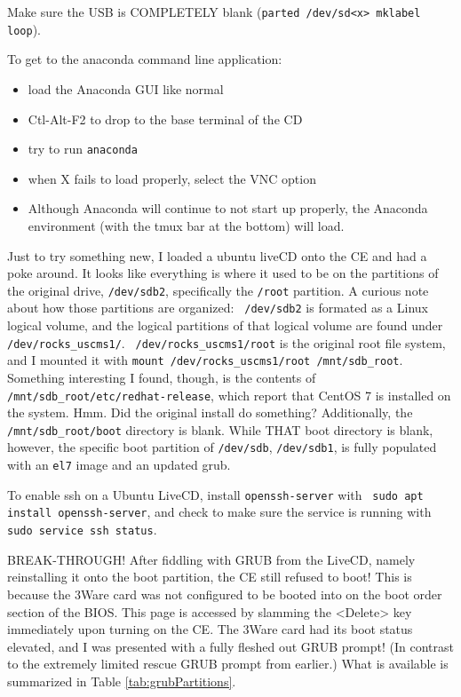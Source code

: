 \documentclass[12pt]{article}
\begin{document}
\qq Make sure the USB is COMPLETELY blank ({\tt parted /dev/sd<x> mklabel loop}).

\qq To get to the anaconda command line application:
\begin{itemize}
  \item load the Anaconda GUI like normal
  \item Ctl-Alt-F2 to drop to the base terminal of the CD
  \item try to run {\tt anaconda}
  \item when X fails to load properly, select the VNC option
  \item Although Anaconda will continue to not start up properly, the Anaconda
    environment (with the tmux bar at the bottom) will load.
\end{itemize}

\qq Just to try something new, I loaded a ubuntu liveCD onto the CE and had a
poke around. It looks like everything is where it used to be on the partitions
of the original drive, {\tt /dev/sdb2}, specifically the {\tt /root}
partition. A curious note about how those partitions are organized: {\tt
  /dev/sdb2} is formated as a Linux logical volume, and the logical partitions
of that logical volume are found under {\tt /dev/rocks\_uscms1/}. {\tt
  /dev/rocks\_uscms1/root} is the original root file system, and I mounted it
with {\tt mount /dev/rocks\_uscms1/root /mnt/sdb\_root}. Something interesting I
found, though, is the contents of {\tt /mnt/sdb\_root/etc/redhat-release}, which
report that CentOS 7 is installed on the system. Hmm. Did the original install
do something? Additionally, the {\tt /mnt/sdb\_root/boot} directory is
blank. While THAT boot directory is blank, however, the specific boot partition
of {\tt /dev/sdb}, {\tt /dev/sdb1}, is fully populated with an {\tt el7} image
and an updated grub. 

\qq To enable ssh on a Ubuntu LiveCD, install {\tt openssh-server} with {\tt
  sudo apt install openssh-server}, and check to make sure the service is running
with {\tt sudo service ssh status}.

\qq BREAK-THROUGH! After fiddling with GRUB from the LiveCD, namely reinstalling
it onto the boot partition, the CE still refused to boot! This is because the
3Ware card was not configured to be booted into on the boot order section of the
BIOS. This page is accessed by slamming the <Delete> key immediately upon
turning on the CE. The 3Ware card had its boot status elevated, and I was
presented with a fully fleshed out GRUB prompt! (In contrast to the extremely
limited rescue GRUB prompt from earlier.) What is available is summarized in
Table \ref{tab:grubPartitions}.
\end{document}
